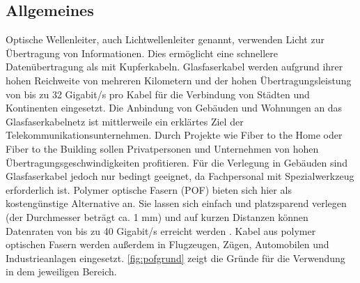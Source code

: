 \subsection{Allgemeines}
\label{subsec:pofallgemeines}

Optische Wellenleiter, auch Lichtwellenleiter genannt, verwenden Licht zur
Übertragung von Informationen. Dies ermöglicht eine schnellere Datenübertragung
als mit Kupferkabeln. Glasfaserkabel werden aufgrund ihrer hohen Reichweite von
mehreren Kilometern und der hohen Übertragungsleistung von bis zu 32 Gigabit/s
pro Kabel für die Verbindung von Städten und Kontinenten eingesetzt. Die
Anbindung von Gebäuden und Wohnungen an das Glasfaserkabelnetz ist mittlerweile
ein erklärtes Ziel der Telekommunikationsunternehmen. Durch Projekte wie \glqq
Fiber to the Home\grqq{} oder \glqq Fiber to the Building\grqq{} sollen
Privatpersonen und Unternehmen von hohen Übertragungsgeschwindigkeiten
profitieren. Für die Verlegung in Gebäuden sind Glasfaserkabel jedoch nur
bedingt geeignet, da Fachpersonal mit Spezialwerkzeug erforderlich ist. Polymer optische Fasern (POF) bieten sich hier als kostengünstige
Alternative an. Sie lassen sich einfach und platzsparend verlegen (der
Durchmesser beträgt ca. 1 mm) und auf kurzen Distanzen 
können Datenraten von bis zu 40 Gigabit/s \cite{pofacgif} erreicht werden
\cite{pofacprofile}. Kabel aus polymer optischen Fasern werden außerdem in
Flugzeugen, Zügen, Automobilen und Industrieanlagen eingesetzt.
\autoref{fig:pofgrund} zeigt die Gründe für die Verwendung in dem jeweiligen
Bereich. \cite{poflan}

